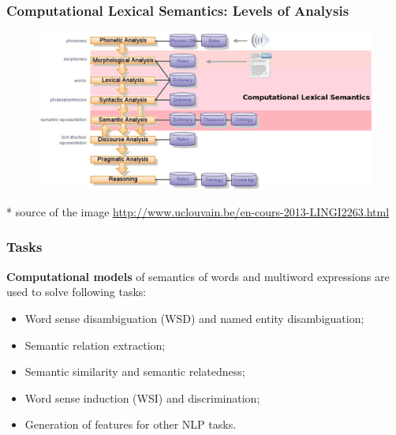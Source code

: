 \begin{frame}
\frametitle{Computational Lexical Semantics: Levels of Analysis}

\begin{figure}
\centering
\includegraphics[width=1.05\textwidth]{figures/levels}
\end{figure}

 \tiny{* source of the image \url{http://www.uclouvain.be/en-cours-2013-LINGI2263.html}}

\end{frame}





\begin{frame}
\frametitle{Tasks}

\textbf{Computational models} of semantics of words and multiword expressions are used to solve following tasks:
 
\begin{itemize}
  \item Word sense disambiguation (WSD) and named entity disambiguation;
  \item Semantic relation extraction;
  \item Semantic similarity and semantic relatedness;
  \item Word sense induction (WSI) and discrimination;
  \item Generation of features for other NLP tasks.
\end{itemize}

\end{frame}




